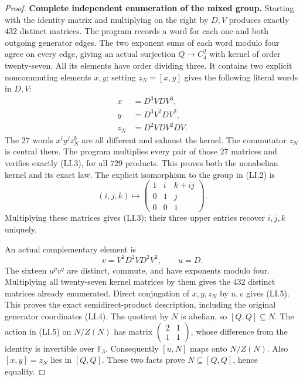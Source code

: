 \begin{proof}
\par\medskip\noindent\textbf{Complete independent enumeration of the mixed group.}\quad
Starting with the identity matrix and multiplying on the right
by $D,V$ produces exactly $432$ distinct matrices.  The program
records a word for each one and both outgoing generator edges.
The two exponent sums of each word modulo four agree on every
edge, giving an actual surjection $Q\to C_4^2$ with kernel of
order twenty-seven.  All its elements have order dividing three.
It contains two explicit noncommuting elements $x,y$; setting
$z_N=[x,y]$ gives the following literal words in $D,V$:
\[
\begin{aligned}
 x&=D^3VDV^3,\\
 y&=D^3V^2DV^2,\\
 z_N&=D^2VDV^2DV.
\end{aligned}                                                    \tag{LI.7}
\]
The $27$ words $x^iy^jz_N^k$ are all different and exhaust
the kernel.  The commutator $z_N$ is central there.
The program multiplies every pair of those $27$ matrices
and verifies exactly (LI.3), for all $729$ products.
This proves both the nonabelian kernel and its exact law.
The explicit isomorphism to the group in (LI.2) is
\[
 (i,j,k)\longmapsto
 \begin{pmatrix}1&i&k+ij\\0&1&j\\0&0&1\end{pmatrix}.
\]
Multiplying these matrices gives (LI.3); their three upper
entries recover $i,j,k$ uniquely.

An actual complementary element is
\[
       v=V^2D^2VD^2V^2,\qquad u=D.                    \tag{LI.8}
\]
The sixteen $u^pv^q$ are distinct, commute, and have
exponents modulo four.  Multiplying all twenty-seven kernel
matrices by them gives the $432$ distinct matrices already
enumerated.  Direct conjugation of $x,y,z_N$ by $u,v$ gives
(LI.5).  This proves the exact semidirect-product description,
including the original generator coordinates (LI.4).
The quotient by $N$ is abelian, so $[Q,Q]\subseteq N$.
The action in (LI.5) on $N/Z(N)$ has matrix
$\left(\begin{smallmatrix}2&1\\1&1\end{smallmatrix}\right)$,
whose difference from the identity is invertible over
$\mathbb F_3$.  Consequently $[u,N]$ maps onto $N/Z(N)$.
Also $[x,y]=z_N$ lies in $[Q,Q]$.  These two facts prove
$N\subseteq[Q,Q]$, hence equality.


\end{proof}
